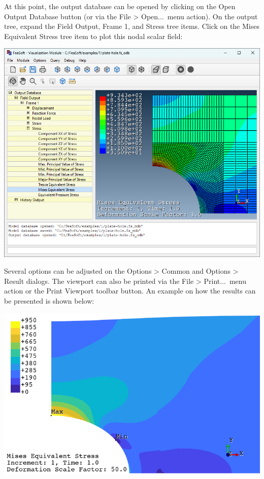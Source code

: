 \documentclass[
    11pt,        %
    a4paper,     %
    final,       %
    fleqn,       %
    notitlepage, %
    onecolumn,   %
    oneside,     %
]{article}
\begin{document}
At this point, the output database can be opened by clicking on the Open Output Database button (or via the File > Open...\ menu action). On the output tree, expand the Field Output, Frame 1, and Stress tree items. Click on the Mises Equivalent Stress tree item to plot this nodal scalar field:
\begin{center}
    \includegraphics[scale=0.5]{fig/ui-1-20.png}
\end{center}

Several options can be adjusted on the Options > Common and Options > Result dialogs. The viewport can also be printed via the File > Print...\ menu action or the Print Viewport toolbar button. An example on how the results can be presented is shown below:
\begin{center}
    \includegraphics[scale=0.5]{fig/ui-1-21.png}
\end{center}
\end{document}
